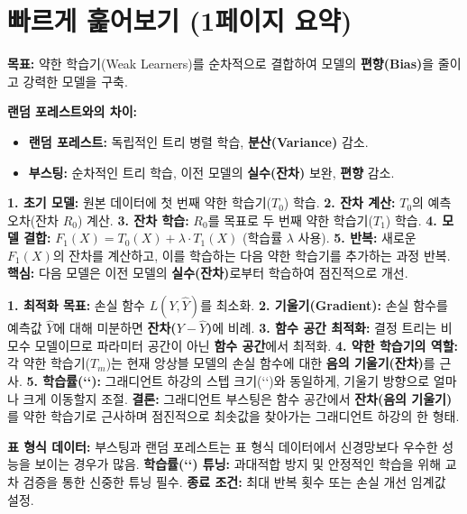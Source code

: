 \documentclass[11pt,a4paper]{article}
\begin{document}
\newpage
\section{빠르게 훑어보기 (1페이지 요약)}

\begin{tcolorbox}[colback=myblue!10, colframe=blue!75!black, title=\textbf{부스팅 핵심 요약}]
\textbf{목표:} 약한 학습기(Weak Learners)를 순차적으로 결합하여 모델의 \textbf{편향(Bias)}을 줄이고 강력한 모델을 구축.

\textbf{랜덤 포레스트와의 차이:}
\begin{itemize}
    \item \textbf{랜덤 포레스트:} 독립적인 트리 병렬 학습, \textbf{분산(Variance)} 감소.
    \item \textbf{부스팅:} 순차적인 트리 학습, 이전 모델의 \textbf{실수(잔차)} 보완, \textbf{편향} 감소.
\end{itemize}
\end{tcolorbox}

\begin{tcolorbox}[colback=mygreen!10, colframe=green!75!black, title=\textbf{그래디언트 부스팅 작동 원리}]
\textbf{1. 초기 모델:} 원본 데이터에 첫 번째 약한 학습기($T_0$) 학습.
\textbf{2. 잔차 계산:} $T_0$의 예측 오차(잔차 $R_0$) 계산.
\textbf{3. 잔차 학습:} $R_0$를 목표로 두 번째 약한 학습기($T_1$) 학습.
\textbf{4. 모델 결합:} $F_1(X) = T_0(X) + \lambda \cdot T_1(X)$ (학습률 $\lambda$ 사용).
\textbf{5. 반복:} 새로운 $F_1(X)$의 잔차를 계산하고, 이를 학습하는 다음 약한 학습기를 추가하는 과정 반복.
\textbf{핵심:} 다음 모델은 이전 모델의 \textbf{실수(잔차)}로부터 학습하여 점진적으로 개선.
\end{tcolorbox}

\begin{tcolorbox}[colback=myyellow!10, colframe=orange!75!black, title=\textbf{그래디언트 하강(Gradient Descent)과의 연결}]
\textbf{1. 최적화 목표:} 손실 함수 $L(Y, \hat{Y})$를 최소화.
\textbf{2. 기울기(Gradient):} 손실 함수를 예측값 $\hat{Y}$에 대해 미분하면 \textbf{잔차($Y - \hat{Y}$)}에 비례.
\textbf{3. 함수 공간 최적화:} 결정 트리는 비모수 모델이므로 파라미터 공간이 아닌 \textbf{함수 공간}에서 최적화.
\textbf{4. 약한 학습기의 역할:} 각 약한 학습기($T_m$)는 현재 앙상블 모델의 손실 함수에 대한 \textbf{음의 기울기(잔차)}를 근사.
\textbf{5. 학습률(`\lambda`):} 그래디언트 하강의 스텝 크기(`\eta`)와 동일하게, 기울기 방향으로 얼마나 크게 이동할지 조절.
\textbf{결론:} 그래디언트 부스팅은 함수 공간에서 \textbf{잔차(음의 기울기)}를 약한 학습기로 근사하며 점진적으로 최솟값을 찾아가는 그래디언트 하강의 한 형태.
\end{tcolorbox}

\begin{tcolorbox}[colback=myred!10, colframe=red!75!black, title=\textbf{중요 사항}]
\textbf{표 형식 데이터:} 부스팅과 랜덤 포레스트는 표 형식 데이터에서 신경망보다 우수한 성능을 보이는 경우가 많음.
\textbf{학습률(`\lambda`) 튜닝:} 과대적합 방지 및 안정적인 학습을 위해 교차 검증을 통한 신중한 튜닝 필수.
\textbf{종료 조건:} 최대 반복 횟수 또는 손실 개선 임계값 설정.
\end{tcolorbox}
\end{document}
